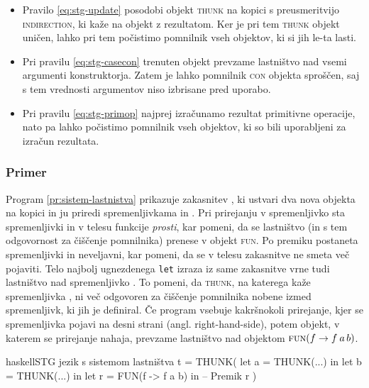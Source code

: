\begin{itemize}
    \itemsep 0em
    \item Pravilo \ref{eq:stg-update} posodobi objekt \textsc{thunk} na kopici s preusmeritvijo \textsc{indirection}, ki kaže na objekt z rezultatom. Ker je pri tem \textsc{thunk} objekt uničen, lahko pri tem počistimo pomnilnik vseh objektov, ki si jih le-ta lasti.
    \item Pri pravilu \ref{eq:stg-casecon} trenuten objekt prevzame lastništvo nad vsemi argumenti konstruktorja. Zatem je lahko pomnilnik \textsc{con} objekta spro\-ščen, saj s tem vrednosti argumentov niso izbrisane pred uporabo. 
    \item Pri pravilu \ref{eq:stg-primop} najprej izračunamo rezultat primitivne operacije, nato pa lahko počistimo pomnilnik vseh objektov, ki so bili uporabljeni za izračun rezultata.
\end{itemize}

\subsubsection{Primer}

Program \ref{pr:sistem-lastnistva} prikazuje zakasnitev , ki ustvari dva nova objekta na kopici in ju priredi spremenljivkama  in . Pri prirejanju v spremenljivko  sta spremenljivki  in  v telesu funkcije \emph{prosti}, kar pomeni, da se lastništvo (in s tem odgovornost za čiščenje pomnilnika) prenese v objekt \textsc{fun}. Po premiku postaneta spremenljivki  in  neveljavni, kar pomeni, da se v telesu zakasnitve ne smeta več pojaviti. Telo najbolj ugnezdenega \texttt{let} izraza iz same zakasnitve  vrne tudi lastništvo nad spremenljivko . To pomeni, da \textsc{thunk}, na katerega kaže spremenljivka , ni več odgovoren za čiščenje pomnilnika nobene izmed spremenljivk, ki jih je definiral. Če program vsebuje kakršnokoli prirejanje, kjer se spremenljivka  pojavi na desni strani (angl. right-hand-side), potem objekt, v katerem se prirejanje nahaja, prevzame lastništvo nad objektom $\textsc{fun}(f \to f \: a \, b)$.

\begin{primer}[ht]
\centering
\begin{code-box}{haskell}{STG jezik s sistemom lastništva \cmark}
t = THUNK(
    let a = THUNK(...)      in
    let b = THUNK(...)      in
    let r = FUN(f -> f a b) in  -- Premik
        r
)
\end{code-box}
\caption{Veljaven program v STG jeziku s sistemom lastništva}
\label{pr:sistem-lastnistva}
\end{primer}

